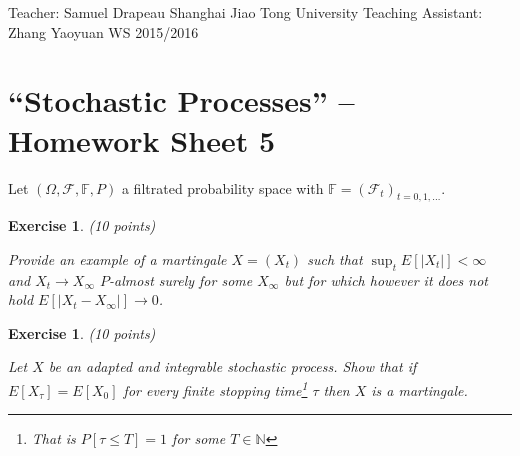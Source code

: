 \documentclass[DIV=classic,a4paper,10pt]{scrartcl}
\newtheorem{exercise}[theorem]{Exercise}
\theoremstyle{nonumberplain}
\newtheorem{proof}{Proof}
\numberwithin{equation}{section}
\begin{document}
\noindent
Teacher: Samuel Drapeau \hfill Shanghai Jiao Tong University \newline
Teaching Assistant: Zhang Yaoyuan \hfill WS 2015/2016

\smallskip
\noindent
\hrulefill

\smallskip

\setcounter{section}{5}

\pagestyle{empty}


\section*{``Stochastic Processes'' -- Homework Sheet 5}
\thispagestyle{empty}




Let $(\Omega,\mathcal{F},\mathbb{F},P)$ a filtrated probability space with $\mathbb{F}=(\mathcal{F}_t)_{t=0,1,\ldots}$.

\begin{exercise}(10 points)

    Provide an example of a martingale $X=(X_t)$ such that $\sup_t E[|X_t|]<\infty$ and $X_t\to X_{\infty}$ $P$-almost surely for some $X_{\infty}$ but for which however it does not hold $E[|X_t-X_{\infty}|] \to 0$.
\end{exercise}
    

\begin{exercise}(10 points)

    Let $X$ be an adapted and integrable stochastic process.
    Show that if $E[X_\tau]=E[X_0]$ for every finite stopping time\footnote{That is $P[\tau\leq T]=1$ for some $T \in \mathbb{N}$} $\tau$ then $X$ is a martingale.
\end{exercise}

    
\end{document}
